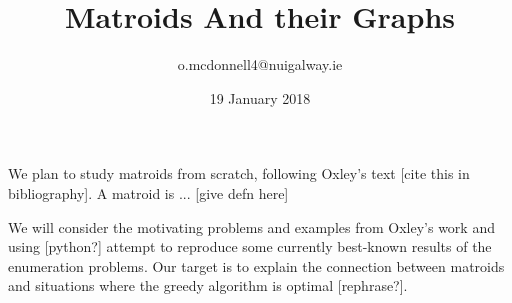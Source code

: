 \documentclass{article}
\title{Matroids And their Graphs}
\author{o.mcdonnell4@nuigalway.ie }
\date{19 January 2018}
\theoremstyle{plain}
\theoremstyle{definition}
\theoremstyle{remark}
\begin{document}
\maketitle

We plan to study matroids from scratch, following Oxley's text [cite this in bibliography]. A matroid is ... [give defn here]

We will consider the motivating problems and examples from Oxley's work and using [python?] attempt to reproduce some currently best-known results of the enumeration problems. Our target is to explain the connection between matroids and situations where the greedy algorithm is optimal [rephrase?].
\end{document}
